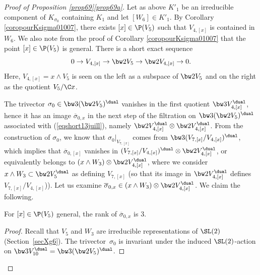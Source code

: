 \begin{proof}[Proof of Proposition \ref{prop69}\eqref{prop69a}]
Let as above $K'_1$ be an irreducible component of $K_{\sigma_0}$ containing $K_1$ and let $[W_6]\in K'_1$. By Corollary \ref{coropourKsigma01007}, there exists
$[x]\in\P(V_5)$ such that $V_{4,[x]}$ is contained in $W_6$. We also note from the proof of
Corollary \ref{coropourKsigma01007} that the point $[x]\in\P(V_5)$ is general.
There is a short exact sequence
\begin{equation}\label{eqshort13juill}
0\to V_{4,[x]}\to \bw2V_5\to \bw2V_{4,[x]}\to 0.
\end{equation}
Here, $V_{4,[x]}=x\wedge V_5$ is seen on the left as a subspace of $ \bw2V_5$ and on the right as the quotient $V_5/\C x$.

The trivector $\sigma_0\in\bw3(\bw2V_5)^\dual$ vanishes in the first quotient $\bw3V_{4,[x]}^\dual$, hence
it has an image $\overline{\sigma}_{0,x}$ in the next step of the filtration on $\bw3(\bw2V_5)^\dual$ associated with
(\ref{eqshort13juill}), namely $\bw2V_{4,[x]}^\dual\otimes \bw2V_{4,[x]}^\dual$.
From the construction of $\sigma_0$, we know that
$\sigma_0\vert_{V_{7,[x]}}$ comes from $\bw3(V_{7,[x]}/V_{4,[x]})^\dual$, which implies that
$\overline{\sigma}_{0,[x]}$ vanishes in $(V_{7,[x]}/V_{4,[x]})^\dual\otimes \bw2V_{4,[x]}^\dual$, or equivalently belongs
to $(x\wedge W_3)\otimes \bw2V_{4,[x]}^\dual$, where we consider $x\wedge W_3\subset \bw2V_{5}^\dual$ as defining $V_{7,[x]}$ (so that its image in $\bw2V_{4,[x]}^\dual$ defines
$V_{7,[x]}/V_{4,[x]}$)).
Let us examine $\overline{\sigma}_{0,x}\in(x\wedge W_3)\otimes \bw2V_{4,[x]}^\dual$. We claim
the following.

\begin{lemm} \label{lerankdesigma0x}
For $[x]\in\P(V_5)$ general, the rank of $\overline{\sigma}_{0,x}$ is $3$.
\end{lemm}

\begin{proof} Recall that $V_5$ and $W_3$ are irreducible representations of $\SL(2)$ (Section~\ref{secXg6}). The trivector~$\sigma_0$ is invariant under the induced $\SL(2)$-action on $\bw3 V_{10}^\dual=\bw3(\bw2V_5)^\dual$.


\end{proof}
\end{proof}
